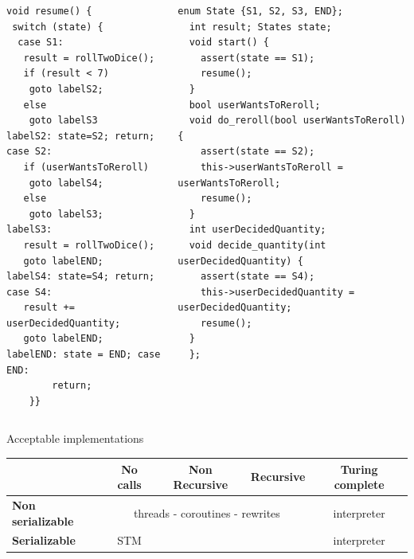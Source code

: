 \documentclass[aspectratio=169,11pt]{beamer}
\begin{document}
\begin{frame}

  \begin{columns}[T,onlytextwidth]
\begin{column}{0.50\textwidth}
\begin{lstlisting}[style=cppstyle, numbers=none]
void resume() {
 switch (state) {
  case S1:
   result = rollTwoDice();
   if (result < 7)
    goto labelS2;
   else
    goto labelS3
labelS2: state=S2; return; case S2:
   if (userWantsToReroll)
    goto labelS4;
   else
    goto labelS3;
labelS3: 
   result = rollTwoDice();  
   goto labelEND;
labelS4: state=S4; return; case S4:
   result += userDecidedQuantity;
   goto labelEND;
labelEND: state = END; case END:
        return;
    }}
\end{lstlisting}

\end{column}
\begin{column}{0.45\textwidth}
\begin{lstlisting}[style=cppstyle, numbers=none]
  enum State {S1, S2, S3, END};
  int result; States state; 
  void start() {
    assert(state == S1);
    resume();
  }
  bool userWantsToReroll;
  void do_reroll(bool userWantsToReroll) {
    assert(state == S2);
    this->userWantsToReroll = userWantsToReroll;
    resume();
  }
  int userDecidedQuantity;
  void decide_quantity(int userDecidedQuantity) {
    assert(state == S4);
    this->userDecidedQuantity = userDecidedQuantity;
    resume();
  }
  };
\end{lstlisting}
\end{column}
\end{columns}
\end{frame}


\begin{frame}{Acceptable implementations}
\renewcommand{\arraystretch}{1.3} %
\setlength{\tabcolsep}{3pt}       %


\begin{tabularx}{\textwidth}{l|c|c|c|c}
\hline
 & \textbf{No calls}
 & \textbf{Non Recursive}
 & \textbf{Recursive}
 & \textbf{Turing complete} \\
\hline
    \textbf{Non serializable}       &  \multicolumn{3}{|c|}{threads - coroutines - rewrites} & interpreter  \\
\hline
\textbf{Serializable}        & STM &  &  &  interpreter \\
\hline
\end{tabularx}
\end{frame}
\end{document}
